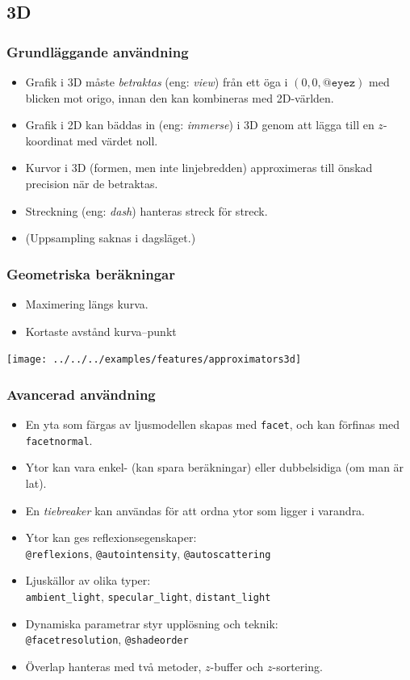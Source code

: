 \documentclass[noamsthm,handout]{beamer}
\newcommand{\inEnglish}[1]{(eng: \emph{#1})}
\begin{document}
\subsection{3D}
\begin{frame}\frametitle{Grundläggande användning}
  \begin{itemize}
  \item Grafik i 3D måste \emph{betraktas} \inEnglish{view} från ett öga i $(0,0,\texttt{@eyez})$ med blicken mot origo, innan den kan kombineras med 2D-världen.
  \item Grafik i 2D kan bäddas in \inEnglish{immerse} i 3D genom att lägga till en $z$-koordinat med värdet noll.
  \item Kurvor i 3D (formen, men inte linjebredden) approximeras till önskad precision när de betraktas.
  \item Streckning \inEnglish{dash} hanteras streck för streck.
  \item (Uppsampling saknas i dagsläget.)
  \end{itemize}
\end{frame}
\begin{frame}\frametitle{Geometriska beräkningar}
  \begin{itemize}
  \item Maximering längs kurva.
  \item Kortaste avstånd kurva--punkt
  \end{itemize}
  \begin{center}
    \texttt{[image: ../../../examples/features/approximators3d]}
  \end{center}
\end{frame}
\begin{frame}\frametitle{Avancerad användning}
  \begin{itemize}
  \item En yta som färgas av ljusmodellen skapas med \texttt{facet}, och kan förfinas med \texttt{facetnormal}.
  \item Ytor kan vara enkel- (kan spara beräkningar) eller dubbelsidiga (om man är lat).
  \item En \emph{tiebreaker} kan användas för att ordna ytor som ligger i varandra.
  \item Ytor kan ges reflexionsegenskaper:\\
    \texttt{@reflexions}, \texttt{@autointensity}, \texttt{@autoscattering}
  \item Ljuskällor av olika typer:\\
    \texttt{ambient\_light}, \texttt{specular\_light}, \texttt{distant\_light}
  \item Dynamiska parametrar styr upplösning och teknik:\\
    \texttt{@facetresolution}, \texttt{@shadeorder}
  \item Överlap hanteras med två metoder, $z$-buffer och $z$-sortering.
  \end{itemize}
\end{frame}
\end{document}
